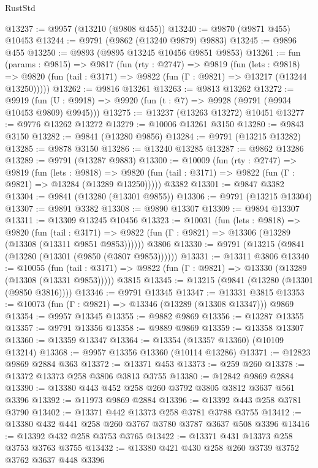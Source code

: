 \begin{lexlean}{RustStd}
\begin{coremodule}
@13237 := @9957 (@13210 (@9808 @455))
@13240 := @9870 (@9871 @455) @10453
@13244 := @9791 (@9862 (@13240 @9879) @9883)
@13245 := @9896 @455
@13250 := @9893 (@9895 @13245 @10456 @9851 @9853)
@13261 := fun (params : @9815) =>
  @9817
    (fun (rty : @2747) =>
    @9819
      (fun (lets : @9818) =>
      @9820 (fun (tail : @3171) => @9822 (fun (Γ : @9821) => @13217 (@13244 @13250)))))
@13262 := @9816 @13261
@13263 := @9813 @13262
@13272 := @9919
    (fun (U : @9918) => @9920 (fun (t : @7) => @9928 (@9791 (@9934 @10453 @9809) @9945)))
@13275 := @13237 (@13263 @13272) @10451
@13277 := @9776 @13262 @13272
@13279 := @10006 @13261 @3150
@13280 := @9843 @3150
@13282 := @9841 (@13280 @9856)
@13284 := @9791 (@13215 @13282)
@13285 := @9878 @3150
@13286 := @13240 @13285
@13287 := @9862 @13286
@13289 := @9791 (@13287 @9883)
@13300 := @10009
    (fun (rty : @2747) =>
    @9819
      (fun (lets : @9818) =>
      @9820 (fun (tail : @3171) => @9822 (fun (Γ : @9821) => @13284 (@13289 @13250)))))
    @3382
@13301 := @9847 @3382
@13304 := @9841 (@13280 (@13301 @9855))
@13306 := @9791 (@13215 @13304)
@13307 := @9891 @3382
@13308 := @9890 @13307
@13309 := @9894 @13307
@13311 := @13309 @13245 @10456
@13323 := @10031
    (fun (lets : @9818) =>
    @9820
      (fun (tail : @3171) =>
      @9822 (fun (Γ : @9821) => @13306 (@13289 (@13308 (@13311 @9851 @9853))))))
    @3806
@13330 := @9791 (@13215 (@9841 (@13280 (@13301 (@9850 (@3807 @9853))))))
@13331 := @13311 @3806
@13340 := @10055
    (fun (tail : @3171) => @9822 (fun (Γ : @9821) => @13330 (@13289 (@13308 (@13331 @9853)))))
    @3815
@13345 := @13215 (@9841 (@13280 (@13301 (@9850 @3816))))
@13346 := @9791 @13345
@13347 := @13331 @3815
@13353 := @10073 (fun (Γ : @9821) => @13346 (@13289 (@13308 @13347))) @9869
@13354 := @9957 @13345
@13355 := @9882 @9869
@13356 := @13287 @13355
@13357 := @9791 @13356
@13358 := @9889 @9869
@13359 := @13358 @13307
@13360 := @13359 @13347
@13364 := @13354 (@13357 @13360) (@10109 @13214)
@13368 := @9957 @13356 @13360 (@10114 @13286)
@13371 := @12823 @9869 @2884 @363
@13372 := @13371 @453
@13373 := @259 @260
@13378 := @13372 @13373 @258 @3806 @3813 @3755
@13380 := @12842 @9869 @2884
@13390 := @13380 @443 @452 @258 @260 @3792 @3805 @3812 @3637 @561 @3396
@13392 := @11973 @9869 @2884
@13396 := @13392 @443 @258 @3781 @3790
@13402 := @13371 @442 @13373 @258 @3781 @3788 @3755
@13412 := @13380 @432 @441 @258 @260 @3767 @3780 @3787 @3637 @508 @3396
@13416 := @13392 @432 @258 @3753 @3765
@13422 := @13371 @431 @13373 @258 @3753 @3763 @3755
@13432 := @13380 @421 @430 @258 @260 @3739 @3752 @3762 @3637 @448 @3396

\end{coremodule}
\end{lexlean}
